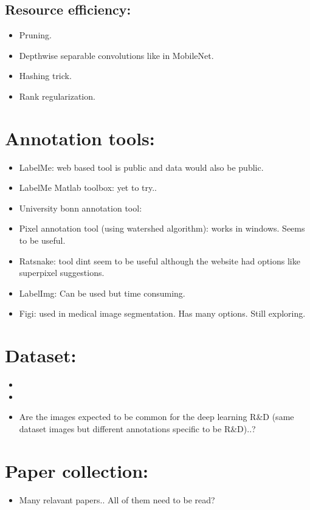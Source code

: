 \documentclass[14pt]{extarticle}
\begin{document}
\subsection{Resource efficiency:}
\begin{itemize}
	\item Pruning.
	\item Depthwise separable convolutions like in MobileNet.
	\item Hashing trick.
	\item Rank regularization.
\end{itemize}

\section{Annotation tools:}
\begin{itemize}
	\item LabelMe: web based tool is public and data would also be public.
	\item LabelMe Matlab toolbox: yet to try..
	\item University bonn annotation tool:
	\item Pixel annotation tool (using watershed algorithm): works in windows. Seems to be useful.
	\item Ratsnake: tool dint seem to be useful although the website had options like superpixel suggestions.
	\item LabelImg: Can be used but time consuming.
	\item Figi: used in medical image segmentation. Has many options. Still exploring.
\end{itemize}

\section{Dataset:}
\begin{itemize}
	\item 
	\item 
	\item Are the images expected to be common for the deep learning R\&D (same dataset images but different annotations specific to be R\&D)..?
\end{itemize}

\section{Paper collection:}
\begin{itemize}
	\item Many relavant papers.. All of them need to be read?
\end{itemize}




\end{document}
